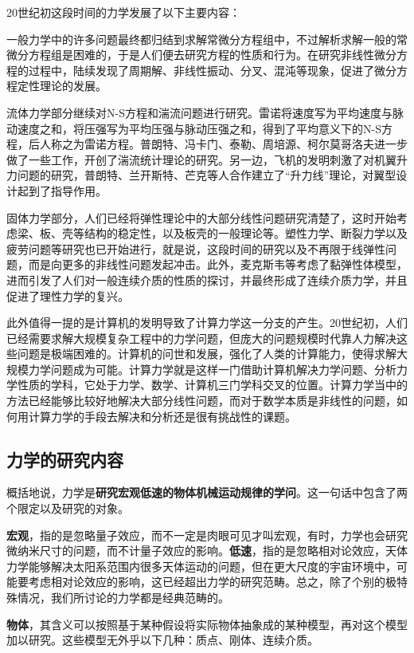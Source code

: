 20世纪初这段时间的力学发展了以下主要内容：

一般力学中的许多问题最终都归结到求解常微分方程组中，不过解析求解一般的常微分方程组是困难的，于是人们便去研究方程的性质和行为。在研究非线性微分方程的过程中，陆续发现了周期解、非线性振动、分叉、混沌等现象，促进了微分方程定性理论的发展。%

流体力学部分继续对N-S方程和湍流问题进行研究。雷诺将速度写为平均速度与脉动速度之和，将压强写为平均压强与脉动压强之和，得到了平均意义下的N-S方程，后人称之为雷诺方程。普朗特、冯卡门、泰勒、周培源、柯尔莫哥洛夫进一步做了一些工作，开创了湍流统计理论的研究。另一边，飞机的发明刺激了对机翼升力问题的研究，普朗特、兰开斯特、芒克等人合作建立了“升力线”理论，对翼型设计起到了指导作用。

固体力学部分，人们已经将弹性理论中的大部分线性问题研究清楚了，这时开始考虑梁、板、壳等结构的稳定性，以及板壳的一般理论等。塑性力学、断裂力学以及疲劳问题等研究也已开始进行，就是说，这段时间的研究以及不再限于线弹性问题，而是向更多的非线性问题发起冲击。此外，麦克斯韦等考虑了黏弹性体模型，进而引发了人们对一般连续介质的性质的探讨，并最终形成了连续介质力学，并且促进了理性力学的复兴。

此外值得一提的是计算机的发明导致了计算力学这一分支的产生。20世纪初，人们已经需要求解大规模复杂工程中的力学问题，但庞大的问题规模时代靠人力解决这些问题是极端困难的。计算机的问世和发展，强化了人类的计算能力，使得求解大规模力学问题成为可能。计算力学就是这样一门借助计算机解决力学问题、分析力学性质的学科，它处于力学、数学、计算机三门学科交叉的位置。计算力学当中的方法已经能够比较好地解决大部分线性问题，而对于数学本质是非线性的问题，如何用计算力学的手段去解决和分析还是很有挑战性的课题。

\subsection{力学的研究内容}

概括地说，力学是\textbf{研究宏观低速的物体机械运动规律的学问}。这一句话中包含了两个限定以及研究的对象。

\textbf{宏观}，指的是忽略量子效应，而不一定是肉眼可见才叫宏观，有时，力学也会研究微纳米尺寸的问题，而不计量子效应的影响。\textbf{低速}，指的是忽略相对论效应，天体力学能够解决太阳系范围内很多天体运动的问题，但在更大尺度的宇宙环境中，可能要考虑相对论效应的影响，这已经超出力学的研究范畴。总之，除了个别的极特殊情况，我们所讨论的力学都是经典范畴的。

\textbf{物体}，其含义可以按照基于某种假设将实际物体抽象成的某种模型，再对这个模型加以研究。这些模型无外乎以下几种：质点、刚体、连续介质。

